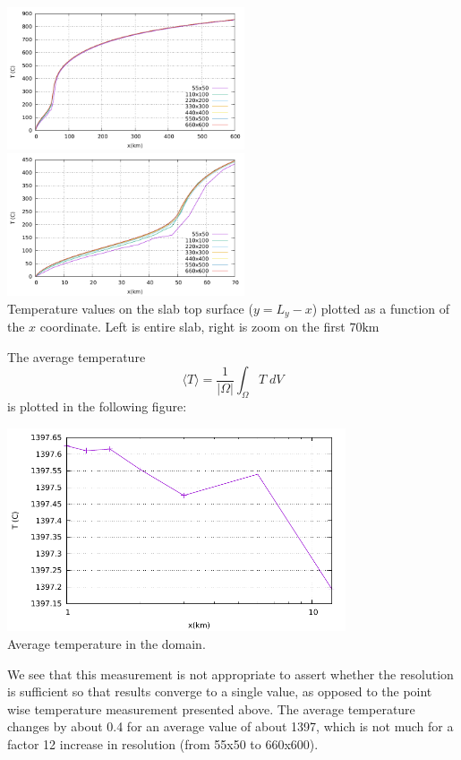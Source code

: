 \begin{center}
\includegraphics[width=7cm]{python_codes/fieldstone_45/images/tempdiag}
\includegraphics[width=7cm]{python_codes/fieldstone_45/images/tempdiag_zoom}\\
{\small Temperature values on the slab top surface ($y=L_y-x$) plotted as a function of the $x$ coordinate.
Left is entire slab, right is zoom on the first $70\text{km}$}
\end{center}

The average temperature 
\[
\langle T\rangle =\frac{1}{|\Omega|}\int_\Omega T \; dV
\]
is plotted in the following figure:
\begin{center}
\includegraphics[width=10cm]{python_codes/fieldstone_45/images/Tavrg.pdf}\\
{\small Average temperature in the domain.}
\end{center}
We see that this measurement is not 
appropriate to assert whether the resolution is sufficient so that results converge 
to a single value, as opposed to the point wise temperature measurement presented above.
The average temperature changes by about 0.4 for an average value of about 1397, which is 
not much for a factor 12 increase in resolution (from 55x50 to 660x600).








